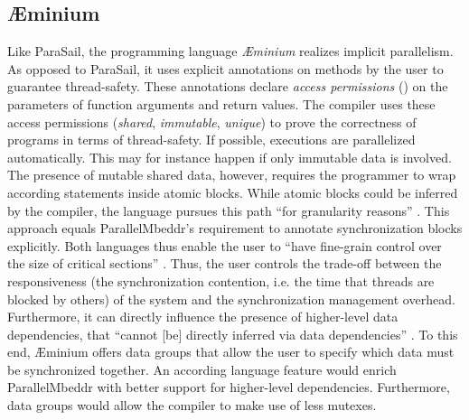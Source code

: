 \subsection{\AE minium}
Like ParaSail, the programming language \textit{\AE minium} realizes implicit parallelism. As opposed to ParaSail, it uses explicit annotations on methods by the user to guarantee thread-safety. These annotations declare \textit{access permissions} (\cite{ModularTypestateChecking}) on the parameters of function arguments and return values. The compiler uses these access permissions (\textit{shared}, \textit{immutable}, \textit{unique}) to prove the correctness of programs in terms of thread-safety. If possible, executions are parallelized automatically. This may for instance happen if only immutable data is involved. The presence of mutable shared data, however, requires the programmer to wrap according statements inside atomic blocks. While atomic blocks could be inferred by the compiler, the language pursues this path ``for granularity reasons'' \cite{ConcurrencyByDefault}. This approach equals ParallelMbeddr's requirement to annotate synchronization blocks explicitly. Both languages thus enable the user to ``have fine-grain control over the size of critical sections'' \cite{ConcurrencyByDefault}. Thus, the user controls the trade-off between the responsiveness (the synchronization contention, i.e. the time that threads are blocked by others) of the system and the synchronization management overhead. Furthermore, it can directly influence the presence of higher-level data dependencies, that
``cannot [be] directly inferred via data dependencies'' \cite{ConcurrencyByDefault}. To this end, \AE minium offers data groups that allow the user to specify which data must be synchronized together. An according language feature would enrich ParallelMbeddr with better support for higher-level dependencies. Furthermore, data groups would allow the compiler to make use of less mutexes.

